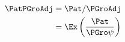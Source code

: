   \begin{equation}\begin{gathered}\begin{aligned}
    \PatPGroAdj  & = \Pat/\PGroAdj   
    \\ & = \Ex\left(\frac{\Pat}{\PGro \psi}\right)  \label{eq:GPF}
  \end{aligned}\end{gathered}\end{equation}
